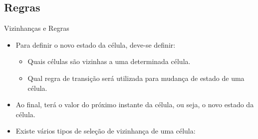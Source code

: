 \documentclass[compress, hide notes]{beamer}
\begin{document}
\subsection{Regras}
\begin{frame}{Vizinhanças e Regras \cite{ufmg}}
	
    \begin{itemize}
    \setlength\itemsep{14pt}
    
    	\item Para definir o novo estado da célula, deve-se definir:

        \begin{itemize}
            \setlength\itemsep{6pt}

            \item Quais células são vizinhas a uma determinada célula.

            \item Qual regra de transição será utilizada para mudança de estado de uma célula.

        \end{itemize}
        
        \item Ao final, terá o valor do próximo instante da célula, ou seja, o novo estado da célula.
        
        \item Existe vários tipos de seleção de vizinhança de uma célula:
	\end{itemize}
\end{frame}
\end{document}
